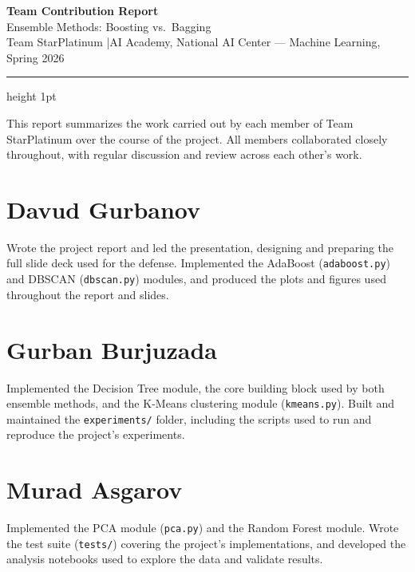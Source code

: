 \documentclass[11pt]{article}
\begin{document}
\begin{center}
{\LARGE\bfseries\color{spPurple} Team Contribution Report}\\[0.3em]
{\large Ensemble Methods: Boosting vs.\ Bagging}\\[0.2em]
{\normalsize\color{spGray} Team StarPlatinum \quad|\quad AI Academy, National AI Center --- Machine Learning, Spring 2026}
\end{center}

\vspace{0.3cm}
{\color{spPurple}\hrule height 1pt}
\vspace{0.6cm}

\noindent This report summarizes the work carried out by each member of Team StarPlatinum over the course of the project. All members collaborated closely throughout, with regular discussion and review across each other's work.

\section*{Davud Gurbanov}
Wrote the project report and led the presentation, designing and preparing the full slide deck used for the defense. Implemented the AdaBoost (\texttt{adaboost.py}) and DBSCAN (\texttt{dbscan.py}) modules, and produced the plots and figures used throughout the report and slides.

\section*{Gurban Burjuzada}
Implemented the Decision Tree module, the core building block used by both ensemble methods, and the K-Means clustering module (\texttt{kmeans.py}). Built and maintained the \texttt{experiments/} folder, including the scripts used to run and reproduce the project's experiments.

\section*{Murad Asgarov}
Implemented the PCA module (\texttt{pca.py}) and the Random Forest module. Wrote the test suite (\texttt{tests/}) covering the project's implementations, and developed the analysis notebooks used to explore the data and validate results.
\end{document}
